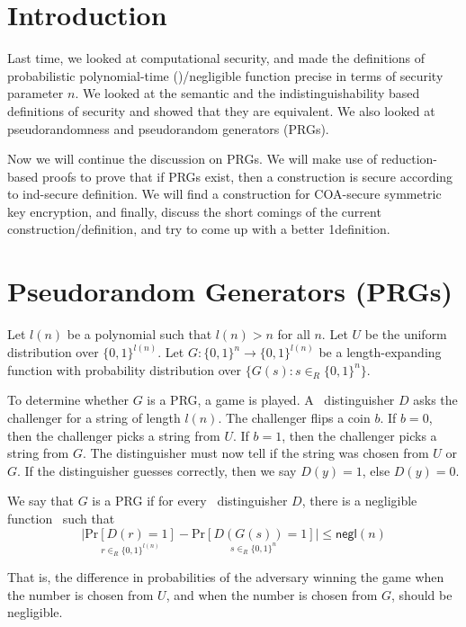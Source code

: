 \documentclass[11pt]{article}
\begin{document}

\section{Introduction}
Last time, we looked at computational security,  and made the definitions of probabilistic polynomial-time (\ppt)/negligible function precise in terms of security parameter \(n\). We looked at the semantic and the indistinguishability based definitions of security and showed that they are equivalent. We also looked at pseudorandomness and pseudorandom generators (PRGs).

Now we will continue the discussion on PRGs. We will make use of reduction-based proofs to prove that if PRGs exist, then a construction is secure according to ind-secure definition. We will find a construction for COA-secure symmetric key encryption, and finally, discuss the short comings of the current construction/definition, and try to come up with a better 1definition.  

\section{Pseudorandom Generators (PRGs) \cite{katz} \cite{patra}}

Let \(l(n)\) be a polynomial such that \(l(n) > n\) for all \(n\). Let \(U\) be the uniform distribution over \(\{0, 1 \} ^{l(n)}\). Let \(G \colon \{0, 1\}^n \to \{0, 1\}^{l(n)}\) be a length-expanding function with probability distribution over \(\{G(s) : s \in _{R} \{0, 1\}^n \}\).

To determine whether \(G\) is a PRG, a game is played. A \ppt\ distinguisher \(D\) asks the challenger for a string of length \(l(n)\). The challenger flips a coin \(b\). If \(b = 0\), then the challenger picks a string from \(U\). If \(b = 1\), then the challenger picks a string from \(G\). The distinguisher must now tell if the string was chosen from \(U\) or \(G\). If the distinguisher guesses correctly, then we say \(D(y) = 1\), else \(D(y) = 0\).

We say that \(G\) is a PRG if for every \ppt\ distinguisher \(D\), there is a negligible function \negl\ such that
\[ \big| \underset{r \in _R \{0, 1\}^{l(n)}}{\mathrm{Pr}[D(r) = 1]} - \underset{s \in _R \{0, 1\}^n}{\mathrm{Pr} [D(G(s)) = 1]} \big| \le \mathsf{negl}(n) \]

That is, the difference in probabilities of the adversary winning the game when the number is chosen from \(U\), and when the number is chosen from \(G\), should be negligible.
\end{document}
